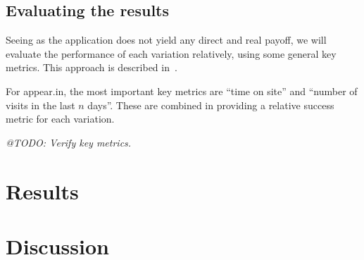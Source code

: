 \subsection{Evaluating the results} %
\label{sub:evaluating_the_results}

Seeing as the application does not yield any direct and real payoff, we will evaluate the performance of each variation relatively, using some general key metrics. This approach is described in~\cite{Yue2012}.

For appear.in, the most important key metrics are ``time on site'' and ``number of visits in the last $n$ days''. These are combined in providing a relative success metric for each variation.

\emph{@TODO: Verify key metrics.}




\section{Results} %
\label{sec:results}


\section{Discussion} %
\label{sec:discussion}


